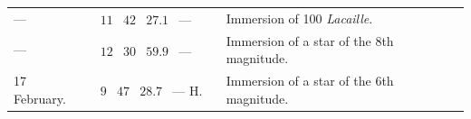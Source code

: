 \begin{center}
\begin{tabular}{llp{.37\linewidth}}
\hfill — & $\begin{array}{rrrl}11&42&27.1&\text{— H.}\end{array}$ & Immersion of 100 \emph{Lacaille}.\\[3pt]
\hfill — & $\begin{array}{rrrl}12&30&59.9&\text{— H.}\end{array}$ & Immersion of a star of the 8th magnitude.\\[3pt]
17 February. & $\begin{array}{rrrl}9&47&28.7&\text{— H.}\end{array}$ & Immersion of a star of the 6th magnitude.\\
\end{tabular}\end{center}
